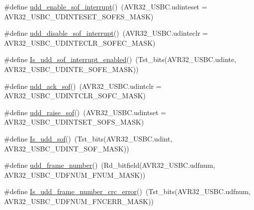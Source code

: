 \begin{DoxyCompactItemize}
\item 
\#define \hyperlink{group__udd__group_ga307066f7fb27b90020e50f7311b37ff6}{udd\-\_\-enable\-\_\-sof\-\_\-interrupt}()~(\-A\-V\-R32\-\_\-\-U\-S\-B\-C.\-udinteset = \-A\-V\-R32\-\_\-\-U\-S\-B\-C\-\_\-\-U\-D\-I\-N\-T\-E\-S\-E\-T\-\_\-\-S\-O\-F\-E\-S\-\_\-\-M\-A\-S\-K)
\item 
\#define \hyperlink{group__udd__group_ga1210d31d31bcbcaf8374ac4db1521306}{udd\-\_\-disable\-\_\-sof\-\_\-interrupt}()~(\-A\-V\-R32\-\_\-\-U\-S\-B\-C.\-udinteclr = \-A\-V\-R32\-\_\-\-U\-S\-B\-C\-\_\-\-U\-D\-I\-N\-T\-E\-C\-L\-R\-\_\-\-S\-O\-F\-E\-C\-\_\-\-M\-A\-S\-K)
\item 
\#define \hyperlink{group__udd__group_gacc090cdf3bd05a4da6888695fd95786b}{\-Is\-\_\-udd\-\_\-sof\-\_\-interrupt\-\_\-enabled}()~(\-Tst\-\_\-bits(\-A\-V\-R32\-\_\-\-U\-S\-B\-C.\-udinte, \-A\-V\-R32\-\_\-\-U\-S\-B\-C\-\_\-\-U\-D\-I\-N\-T\-E\-\_\-\-S\-O\-F\-E\-\_\-\-M\-A\-S\-K))
\item 
\#define \hyperlink{group__udd__group_ga0b4140471f2e53d93cfe7f05ebd907d7}{udd\-\_\-ack\-\_\-sof}()~(\-A\-V\-R32\-\_\-\-U\-S\-B\-C.\-udintclr = \-A\-V\-R32\-\_\-\-U\-S\-B\-C\-\_\-\-U\-D\-I\-N\-T\-C\-L\-R\-\_\-\-S\-O\-F\-C\-\_\-\-M\-A\-S\-K)
\item 
\#define \hyperlink{group__udd__group_ga3747765066014e9bbde1bb263334c8a0}{udd\-\_\-raise\-\_\-sof}()~(\-A\-V\-R32\-\_\-\-U\-S\-B\-C.\-udintset = \-A\-V\-R32\-\_\-\-U\-S\-B\-C\-\_\-\-U\-D\-I\-N\-T\-S\-E\-T\-\_\-\-S\-O\-F\-S\-\_\-\-M\-A\-S\-K)
\item 
\#define \hyperlink{group__udd__group_ga5b5fcaa7cfa64de404ff9a3a257839a9}{\-Is\-\_\-udd\-\_\-sof}()~(\-Tst\-\_\-bits(\-A\-V\-R32\-\_\-\-U\-S\-B\-C.\-udint, \-A\-V\-R32\-\_\-\-U\-S\-B\-C\-\_\-\-U\-D\-I\-N\-T\-\_\-\-S\-O\-F\-\_\-\-M\-A\-S\-K))
\item 
\#define \hyperlink{group__udd__group_gac175ccc890008605691939957098a246}{udd\-\_\-frame\-\_\-number}()~(\-Rd\-\_\-bitfield(\-A\-V\-R32\-\_\-\-U\-S\-B\-C.\-udfnum, \-A\-V\-R32\-\_\-\-U\-S\-B\-C\-\_\-\-U\-D\-F\-N\-U\-M\-\_\-\-F\-N\-U\-M\-\_\-\-M\-A\-S\-K))
\item 
\#define \hyperlink{group__udd__group_ga6f519fdc7583b259eb11d33555813182}{\-Is\-\_\-udd\-\_\-frame\-\_\-number\-\_\-crc\-\_\-error}()~(\-Tst\-\_\-bits(\-A\-V\-R32\-\_\-\-U\-S\-B\-C.\-udfnum, \-A\-V\-R32\-\_\-\-U\-S\-B\-C\-\_\-\-U\-D\-F\-N\-U\-M\-\_\-\-F\-N\-C\-E\-R\-R\-\_\-\-M\-A\-S\-K))
\end{DoxyCompactItemize}

